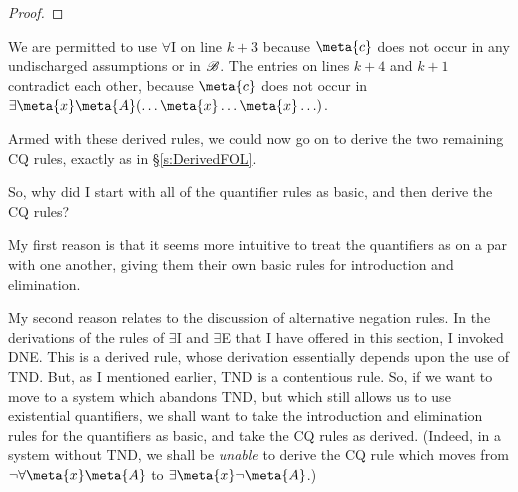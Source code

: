 \begin{proof}
	\open
	\close
	\open
	\close
\end{proof}\noindent
We are permitted to use $\forall$I on line $k+3$ because $\meta{c}$ does not occur in any  undischarged assumptions or in $\mathscr{B}$. The entries on lines $k+4$ and $k+1$ contradict each other, because $\meta{c}$ does not occur in $\exists \meta{x} \meta{A}(\ldots \meta{x} \ldots \meta{x} \ldots)$.

Armed with these derived rules, we could now go on to derive the two remaining CQ rules, exactly as in \S\ref{s:DerivedFOL}.

So, why did I start with all of the quantifier rules as basic, and then derive the CQ rules? 

My first reason is that it seems more intuitive to treat the quantifiers as on a par with one another, giving them their own basic rules for introduction and elimination. 

My second reason relates to the discussion of alternative negation rules. In the derivations of the rules of $\exists$I and $\exists$E that I have offered in this section, I invoked DNE. This is a derived rule, whose derivation essentially depends upon the use of TND. But, as I mentioned earlier, TND is a contentious rule. So, if we want to move to a system which abandons TND, but which still allows us to use existential quantifiers, we shall want to take the introduction and elimination rules for the quantifiers as basic, and take the CQ rules as derived. (Indeed, in a system without TND, we shall be \emph{unable} to derive the CQ rule which moves from $\enot \forall \meta{x} \meta{A}$ to $\exists \meta{x} \enot \meta{A}$.)

